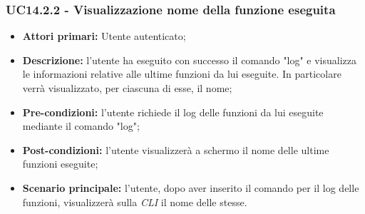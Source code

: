 \subsubsection{UC14.2.2 - Visualizzazione nome della funzione eseguita}
\begin{itemize}
	\item \textbf{Attori primari:} Utente autenticato;
	\item \textbf{Descrizione:} l'utente ha eseguito con successo il comando "log" e visualizza le informazioni relative alle ultime funzioni da lui eseguite. In particolare verrà visualizzato, per ciascuna di esse, il nome; 
	\item \textbf{Pre-condizioni:} l'utente richiede il log delle funzioni da lui eseguite mediante il comando "log"; 
	\item \textbf{Post-condizioni:} l'utente visualizzerà a schermo il nome delle ultime funzioni eseguite;
	\item \textbf{Scenario principale:} l'utente, dopo aver inserito il comando per il log delle funzioni, visualizzerà sulla \textit{CLI\glo} il nome delle stesse.
\end{itemize}